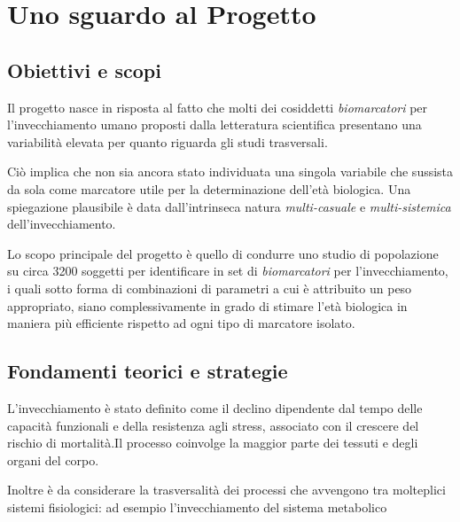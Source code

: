 \documentclass[a4paper]{report}
\begin{document}
\section{Uno sguardo al Progetto}
\subsection{Obiettivi e scopi}
Il progetto nasce in risposta al fatto che molti dei cosiddetti \textit{biomarcatori} per l'invecchiamento umano proposti dalla letteratura scientifica presentano una variabilità elevata per quanto riguarda gli studi trasversali.

Ciò implica che non sia ancora stato individuata una singola variabile che sussista da sola come marcatore utile per la determinazione dell'età biologica. Una spiegazione plausibile è data dall'intrinseca  natura \textit{multi-casuale} e \textit{multi-sistemica} dell'invecchiamento.

Lo scopo principale del progetto è quello di condurre uno studio di popolazione su circa 3200 soggetti per identificare in set di \textit{biomarcatori} per l'invecchiamento, i quali sotto forma di combinazioni di parametri a cui è attribuito un peso appropriato, siano complessivamente in grado di stimare l'età biologica in maniera più efficiente rispetto ad ogni tipo di marcatore isolato.

\subsection{Fondamenti teorici e strategie}
L'invecchiamento è stato definito come il declino dipendente dal tempo delle capacità funzionali e della resistenza agli stress, associato con il crescere del rischio di mortalità.Il processo coinvolge la maggior parte dei tessuti e degli organi del corpo.

Inoltre è da considerare la trasversalità dei processi che avvengono tra molteplici sistemi fisiologici: ad esempio l'invecchiamento del sistema metabolico 
\end{document}
